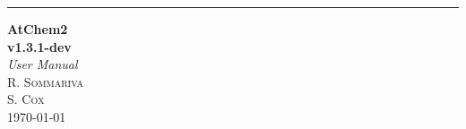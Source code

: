 \documentclass[11pt,a4paper]{report}
\begin{document}
%
%

\begin{titlepage}
  \raggedleft  %
  \rule{1pt}{\textheight}  %
  \hspace{0.05\textwidth}
  \parbox[b]{0.75\textwidth}{
    {\Huge\bfseries AtChem2\\[0.5\baselineskip] v1.3.1-dev}\\[2\baselineskip]  %
    {\LARGE\textit{User Manual}}\\[4\baselineskip]  %
    {\Large\textsc{R. Sommariva\\S. Cox}}  %
    \vspace{0.5\textheight}\\
    {\noindent \today}\\[\baselineskip]  %
    }

\end{titlepage}


\tableofcontents










\end{document}
